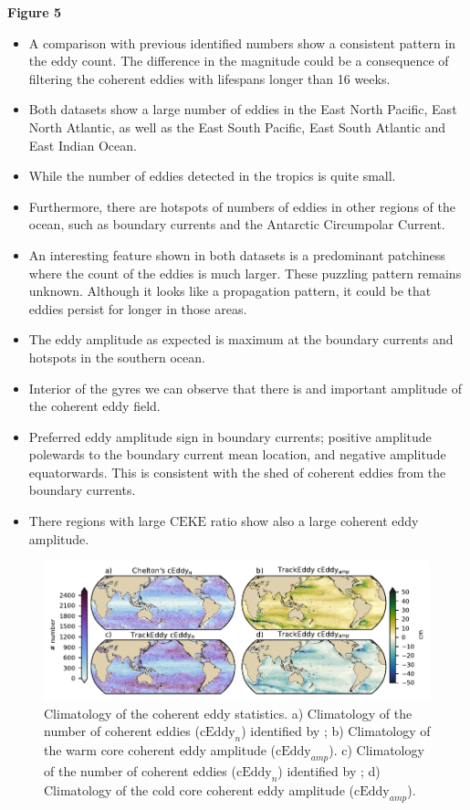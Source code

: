 \documentclass[draft,linenumbers]{agujournal2019}
\newcommand{\CEKE}{\textrm{CEKE}}
\newcommand{\cEddy}{\textrm{cEddy}}
\begin{document}
	\textbf{Figure 5}
	\begin{itemize}
		\item A comparison with previous identified numbers show a consistent pattern in the eddy count. The difference in the magnitude could be a consequence of \citet{Chelton_Global_2007} filtering the coherent eddies with lifespans longer than 16 weeks. 
		\item Both datasets show a large number of eddies in the East North Pacific, East North Atlantic, as well as the East South Pacific, East South Atlantic and East Indian Ocean. 
		\item While the number of eddies detected in the tropics is quite small.
		\item Furthermore, there are hotspots of numbers of eddies in other regions of the ocean, such as boundary currents and the Antarctic Circumpolar Current. 
		\item An interesting feature shown in both datasets is a predominant patchiness where the count of the eddies is much larger. These puzzling pattern remains unknown. Although it looks like a propagation pattern, it could be that eddies persist for longer in those areas.
		\item The eddy amplitude as expected is maximum at the boundary currents and hotspots in the southern ocean.
		\item Interior of the gyres we can observe that there is and important amplitude of the coherent eddy field. 
		\item Preferred eddy amplitude sign in boundary currents; positive amplitude polewards to the boundary current mean location, and negative amplitude equatorwards. This is consistent with the shed of coherent eddies from the boundary currents.
		\item There regions with large $\CEKE$ ratio show also a large coherent eddy amplitude.
	\end{itemize}

	\begin{figure}
	    \centering
	    \includegraphics[width=1\textwidth]{figures/global_stats_polarity.pdf}
	    \caption{Climatology of the coherent eddy statistics. a) Climatology of the number of coherent eddies ($\cEddy_n$) identified by \citet{Chelton_Global_2007}; b) Climatology of the warm core coherent eddy amplitude ($\cEddy_{amp}$). c) Climatology of the number of coherent eddies ($\cEddy_n$) identified by \citet{Martinez_Kinetic_2019}; d) Climatology of the cold core coherent eddy amplitude ($\cEddy_{amp}$).}
	    \label{fig:eddy_stats_climatology}
	\end{figure}
\end{document}
